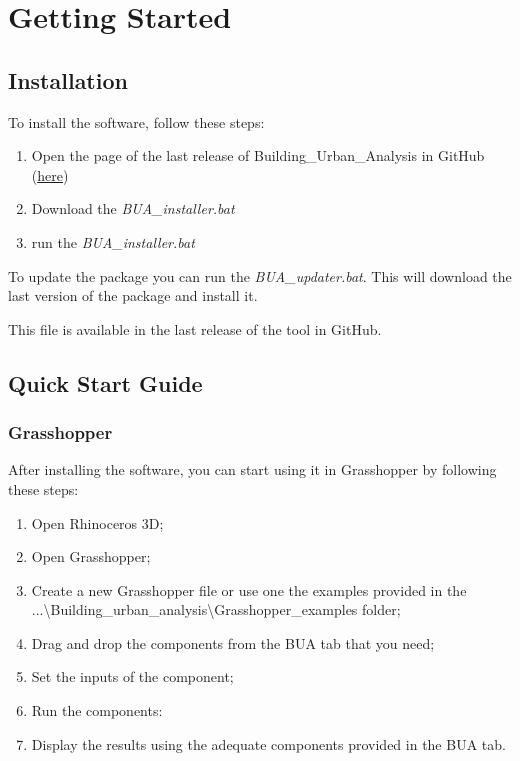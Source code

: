 \documentclass[a4paper,12pt]{article} %
\begin{document}
    \section{Getting Started}

    \subsection{Installation}
    To install the software, follow these steps:
    \begin{enumerate}
        \item Open the page of the last release of Building\_Urban\_Analysis in GitHub (\href{https://github.com/Eliewiii/Building_Urban_Analysis}{here})
        \item Download the \textit{BUA\_installer.bat}
        \item run the \textit{BUA\_installer.bat}
    \end{enumerate}

    To update the package you can run the \textit{BUA\_updater.bat}.
    This will download the last version of the package and install it.

    This file is available in the last release of the tool in GitHub.

    \subsection{Quick Start Guide}

    \subsubsection{Grasshopper}
    After installing the software, you can start using it in Grasshopper by following these steps:
    \begin{enumerate}
        \item Open Rhinoceros 3D;
        \item Open Grasshopper;
        \item Create a new Grasshopper file or use one the examples provided in the ...\textbackslash Building\_urban\_analysis\textbackslash Grasshopper\_examples folder;
        \item Drag and drop the components from the BUA tab that you need;
        \item Set the inputs of the component;
        \item Run the components:
        \item Display the results using the adequate components provided in the BUA tab.
    \end{enumerate}
\end{document}
